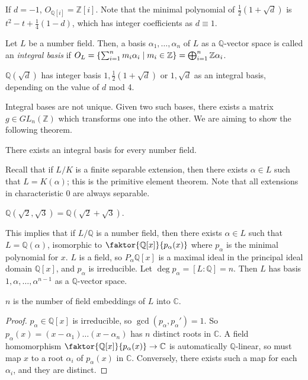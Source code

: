 \begin{example}
    If \( d = -1 \), \( O_{\mathbb Q[i]} = \mathbb Z[i] \).
    Note that the minimal polynomial of \( \frac{1}{2}(1+\sqrt d) \) is \( t^2 - t + \frac{1}{4}(1-d) \), which has integer coefficients as \( d \equiv 1 \).
\end{example}
\begin{definition}
    Let \( L \) be a number field.
    Then, a basis \( \alpha_1, \dots, \alpha_n \) of \( L \) as a \( \mathbb Q \)-vector space is called an \emph{integral basis} if \( O_L = \qty{\sum_{i=1}^n m_i \alpha_i \mid m_i \in \mathbb Z} = \bigoplus_{i=1}^n \mathbb Z \alpha_i \).
\end{definition}
\begin{example}
    \( \mathbb Q(\sqrt d) \) has integer basis \( 1, \frac{1}{2}(1+\sqrt d) \) or \( 1, \sqrt d \) as an integral basis, depending on the value of \( d \) mod 4.
\end{example}
Integral bases are not unique.
Given two such bases, there exists a matrix \( g \in GL_n(\mathbb Z) \) which transforms one into the other.
We are aiming to show the following theorem.
\begin{theorem}
    There exists an integral basis for every number field.
\end{theorem}
Recall that if \( L / K \) is a finite separable extension, then there exists \( \alpha \in L \) such that \( L = K(\alpha) \); this is the primitive element theorem.
Note that all extensions in characteristic 0 are always separable.
\begin{example}
    \( \mathbb Q(\sqrt 2, \sqrt 3) = \mathbb Q(\sqrt 2 + \sqrt 3) \).
\end{example}
This implies that if \( L / \mathbb Q \) is a number field, then there exists \( \alpha \in L \) such that \( L = \mathbb Q(\alpha) \), isomorphic to \( \faktor{\mathbb Q[x]}{p_\alpha(x)} \) where \( p_\alpha \) is the minimal polynomial for \( x \).
\( L \) is a field, so \( P_\alpha \mathbb Q[x] \) is a maximal ideal in the principal ideal domain \( \mathbb Q[x] \), and \( p_\alpha \) is irreducible.
Let \( \deg p_\alpha = [L:\mathbb Q] = n \).
Then \( L \) has basis \( 1, \alpha, \dots, \alpha^{n-1} \) as a \( \mathbb Q \)-vector space.
\begin{lemma}
    \( n \) is the number of field embeddings of \( L \) into \( \mathbb C \).
\end{lemma}
\begin{proof}
    \( p_\alpha \in \mathbb Q[x] \) is irreducible, so \( \gcd(p_\alpha, p_\alpha') = 1 \).
    So \( p_\alpha(x) = (x-\alpha_1)\dots(x-\alpha_n) \) has \( n \) distinct roots in \( \mathbb C \).
    A field homomorphism \( \faktor{\mathbb Q[x]}{p_\alpha(x)} \to \mathbb C \) is automatically \( \mathbb Q \)-linear, so must map \( x \) to a root \( \alpha_i \) of \( p_\alpha(x) \) in \( \mathbb C \).
    Conversely, there exists such a map for each \( \alpha_i \), and they are distinct.
\end{proof}
